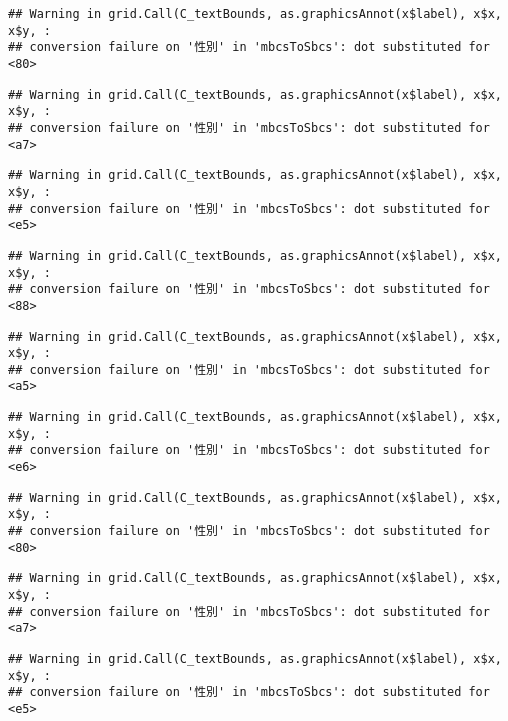 \documentclass[
]{book}
\begin{document}
\begin{verbatim}
## Warning in grid.Call(C_textBounds, as.graphicsAnnot(x$label), x$x, x$y, :
## conversion failure on '性別' in 'mbcsToSbcs': dot substituted for <80>
\end{verbatim}

\begin{verbatim}
## Warning in grid.Call(C_textBounds, as.graphicsAnnot(x$label), x$x, x$y, :
## conversion failure on '性別' in 'mbcsToSbcs': dot substituted for <a7>
\end{verbatim}

\begin{verbatim}
## Warning in grid.Call(C_textBounds, as.graphicsAnnot(x$label), x$x, x$y, :
## conversion failure on '性別' in 'mbcsToSbcs': dot substituted for <e5>
\end{verbatim}

\begin{verbatim}
## Warning in grid.Call(C_textBounds, as.graphicsAnnot(x$label), x$x, x$y, :
## conversion failure on '性別' in 'mbcsToSbcs': dot substituted for <88>
\end{verbatim}

\begin{verbatim}
## Warning in grid.Call(C_textBounds, as.graphicsAnnot(x$label), x$x, x$y, :
## conversion failure on '性別' in 'mbcsToSbcs': dot substituted for <a5>
\end{verbatim}

\begin{verbatim}
## Warning in grid.Call(C_textBounds, as.graphicsAnnot(x$label), x$x, x$y, :
## conversion failure on '性別' in 'mbcsToSbcs': dot substituted for <e6>
\end{verbatim}

\begin{verbatim}
## Warning in grid.Call(C_textBounds, as.graphicsAnnot(x$label), x$x, x$y, :
## conversion failure on '性別' in 'mbcsToSbcs': dot substituted for <80>
\end{verbatim}

\begin{verbatim}
## Warning in grid.Call(C_textBounds, as.graphicsAnnot(x$label), x$x, x$y, :
## conversion failure on '性別' in 'mbcsToSbcs': dot substituted for <a7>
\end{verbatim}

\begin{verbatim}
## Warning in grid.Call(C_textBounds, as.graphicsAnnot(x$label), x$x, x$y, :
## conversion failure on '性別' in 'mbcsToSbcs': dot substituted for <e5>
\end{verbatim}
\end{document}
